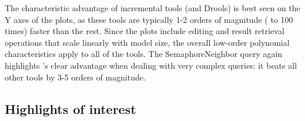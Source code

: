 % 

The characteristic advantage of incremental tools (\ie \eiq and Drools) is best seen on the Y axes of the plots, as these tools are typically 1-2 orders of magnitude ( to 100 times) faster than the rest. Since the plots include editing and result retrieval operations that scale linearly with model size, the overall low-order polynomial characteristics apply to all of the tools. The \textsf{SemaphoreNeighbor} query again highlights \eiq's clear advantage when dealing with very complex queries: it beats all other tools by 3-5 orders of magnitude.


% 

 
 

\subsection{Highlights of interest}

